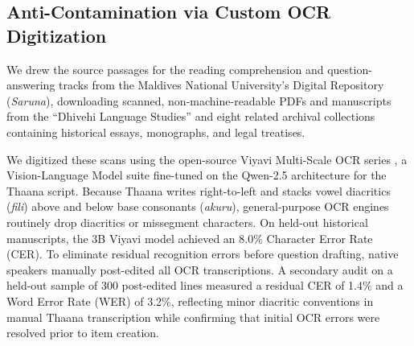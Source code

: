 \documentclass[acmsmall,review,anonymous]{acmart}
\begin{document}
\subsection{Anti-Contamination via Custom OCR Digitization}
We drew the source passages for the reading comprehension and question-answering tracks from the Maldives National University's Digital Repository (\textit{Saruna}), downloading scanned, non-machine-readable PDFs and manuscripts from the ``Dhivehi Language Studies'' and eight related archival collections containing historical essays, monographs, and legal treatises.

We digitized these scans using the open-source Viyavi Multi-Scale OCR series \cite{hameed_bridging_2026}, a Vision-Language Model suite fine-tuned on the Qwen-2.5 architecture for the Thaana script. Because Thaana writes right-to-left and stacks vowel diacritics (\textit{fili}) above and below base consonants (\textit{akuru}), general-purpose OCR engines routinely drop diacritics or missegment characters. On held-out historical manuscripts, the 3B Viyavi model achieved an 8.0\% Character Error Rate (CER). To eliminate residual recognition errors before question drafting, native speakers manually post-edited all OCR transcriptions. A secondary audit on a held-out sample of 300 post-edited lines measured a residual CER of 1.4\% and a Word Error Rate (WER) of 3.2\%, reflecting minor diacritic conventions in manual Thaana transcription while confirming that initial OCR errors were resolved prior to item creation.
\end{document}
